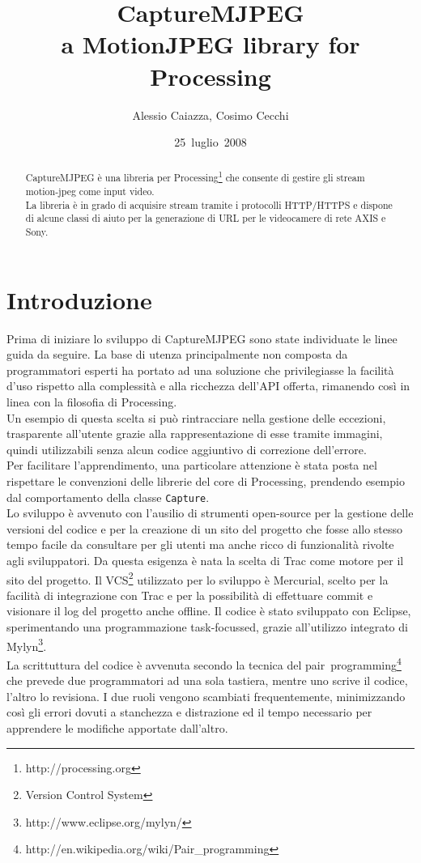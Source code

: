 \documentclass[a4paper,11pt]{article}
\author{Alessio Caiazza, Cosimo Cecchi}
\title{\textbf{CaptureMJPEG}\\ a MotionJPEG library for Processing}
\date{25~luglio~2008}
\begin{document}
\maketitle

\newcommand{\reffigura}[1]{
  Figura \ref{#1}
}

\begin{abstract}
CaptureMJPEG è una libreria per
Processing\footnote{http://processing.org} che consente di gestire gli
stream motion-jpeg come input video.\\
La libreria è in grado di acquisire stream tramite i protocolli
\mbox{HTTP/HTTPS} e dispone di alcune classi di aiuto per la 
generazione di URL per le videocamere di rete AXIS e Sony.  
\end{abstract}
\tableofcontents


\section{Introduzione}
\label{sec:introduzione}
Prima di iniziare lo sviluppo di CaptureMJPEG sono state individuate
le linee guida da seguire.
La base di utenza principalmente non composta da programmatori esperti
ha portato ad una soluzione che privilegiasse la facilit\`a d'uso
rispetto alla complessit\`a e alla ricchezza dell'API offerta,
rimanendo così in linea con la filosofia di Processing.\\
Un esempio di questa scelta si pu\`o rintracciare nella gestione delle
eccezioni, trasparente all'utente grazie alla rappresentazione di esse
tramite immagini, quindi utilizzabili senza alcun codice aggiuntivo di
correzione dell'errore.\\
Per facilitare l'apprendimento, una particolare attenzione \`e stata
posta nel rispettare le convenzioni delle librerie del core di
Processing, prendendo esempio dal comportamento della classe
\texttt{Capture}.\\
Lo sviluppo è avvenuto con l'ausilio di strumenti open-source per la
gestione delle versioni del codice e per la creazione di un sito del 
progetto che fosse allo stesso tempo facile da consultare per gli utenti ma
anche ricco di funzionalit\`a rivolte agli sviluppatori. Da questa
esigenza \`e nata la scelta di Trac come motore per il sito del
progetto. Il VCS\footnote{Version Control System} utilizzato per lo
sviluppo \`e Mercurial, scelto per la facilit\`a di integrazione con 
Trac e per la possibilit\`a di effettuare commit e visionare il log
del progetto anche offline.
Il codice \`e stato sviluppato con Eclipse, sperimentando una 
programmazione task-focussed, grazie all'utilizzo integrato di
Mylyn\footnote{http://www.eclipse.org/mylyn/}.\\
La scrittuttura del codice è avvenuta secondo la tecnica del
pair~programming\footnote{http://en.wikipedia.org/wiki/Pair\_programming}
che prevede due programmatori ad una sola tastiera, mentre uno scrive
il codice, l'altro lo revisiona. I due ruoli vengono scambiati
frequentemente, minimizzando così gli errori dovuti a stanchezza e
distrazione ed il tempo necessario per apprendere le modifiche
apportate dall'altro.
\end{document}
